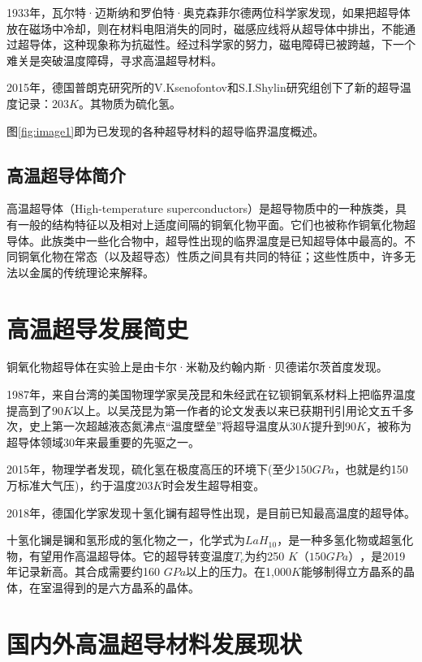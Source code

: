 \documentclass[UTF8, twocolumn]{ctexart}
\begin{document}
    1933年，瓦尔特·迈斯纳和罗伯特·奥克森菲尔德两位科学家发现，如果把超导体放在磁场中冷却，则在材料电阻消失的同时，磁感应线将从超导体中排出，不能通过超导体，这种现象称为抗磁性。经过科学家的努力，磁电障碍已被跨越，下一个难关是突破温度障碍，寻求高温超导材料。

    2015年，德国普朗克研究所的V.Ksenofontov和S.I.Shylin研究组创下了新的超导温度记录：$203K$。其物质为硫化氢。

    图\ref{fig:image1}即为已发现的各种超导材料的超导临界温度概述\cite{Ray2016}。

    \subsection{高温超导体简介}

    高温超导体（High-temperature superconductors）是超导物质中的一种族类，具有一般的结构特征以及相对上适度间隔的铜氧化物平面。它们也被称作铜氧化物超导体。此族类中一些化合物中，超导性出现的临界温度是已知超导体中最高的。不同铜氧化物在常态（以及超导态）性质之间具有共同的特征；这些性质中，许多无法以金属的传统理论来解释。

\section{高温超导发展简史}

    铜氧化物超导体在实验上是由卡尔·米勒及约翰内斯·贝德诺尔茨首度发现。

    1987年，来自台湾的美国物理学家吴茂昆和朱经武在钇钡铜氧系材料上把临界温度提高到了$90K$以上。以吴茂昆为第一作者的论文\cite{PhysRevLett.58.908}发表以来已获期刊引用论文五千多次，史上第一次超越液态氮沸点“温度壁垒”将超导温度从$30K$提升到$90K$，被称为超导体领域30年来最重要的先驱之一。

    2015年，物理学者发现，硫化氢在极度高压的环境下(至少150$GPa$，也就是约150万标准大气压)，约于温度203$K$时会发生超导相变\cite{drozdov2015conventional}。

    2018年，德国化学家发现十氢化镧有超导性出现，是目前已知最高温度的超导体。

    十氢化镧是镧和氢形成的氢化物之一，化学式为$LaH_{10}$，是一种多氢化物或超氢化物，有望用作高温超导体。它的超导转变温度$T_c$为约250 $K$$（150 GPa）$，是2019年记录新高。其合成需要约160 $GPa$以上的压力。在1,000$ K$能够制得立方晶系的晶体，在室温得到的是六方晶系的晶体\cite{drozdov2019superconductivity}。

\section{国内外高温超导材料发展现状}
\end{document}
